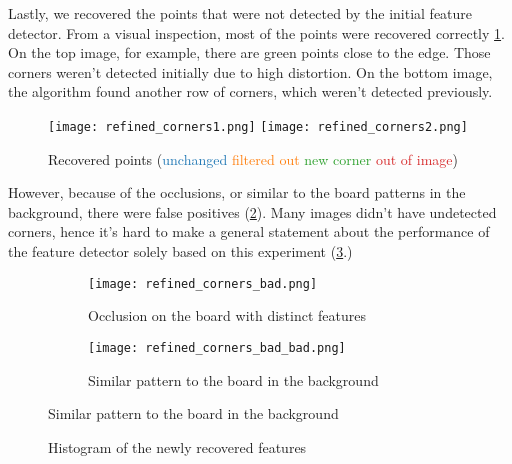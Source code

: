 Lastly, we recovered the points that were not detected by the initial feature
detector.
From a visual inspection, most of the points were recovered correctly
\cref{fig:recovered_good_points}.
On the top image, for example, there are green points close to the edge.
Those corners weren't detected initially due to high distortion. On the bottom
image, the algorithm found another row of corners, which weren't detected previously.

\begin{figure}[h]
	\centering
	\texttt{[image: refined\_corners1.png]}
	\texttt{[image: refined\_corners2.png]}

	\caption{Recovered points
		(\textcolor[HTML]{1f77b4}{unchanged}
		\textcolor[HTML]{ff7f0e}{filtered out}
		\textcolor[HTML]{2ca02c}{new corner}
		\textcolor[HTML]{d62728}{out of image})}
	\label{fig:recovered_good_points}
\end{figure}

\newpage
However,
because of the occlusions, or similar to the board patterns in the background,
there were false positives (\cref{fig:recovered_bad_points}). Many images didn't
have undetected corners, hence it's hard to make a general statement about the
performance of the feature detector solely based on this experiment
(\cref{fig:recovered_points_histogram}.)

\begin{figure}[h]
	\centering
	\begin{subfigure}[h]{0.6\linewidth}
		\texttt{[image: refined\_corners\_bad.png]}
		\caption{Occlusion on the board with distinct features}
	\end{subfigure}
	\begin{subfigure}[h]{0.6\linewidth}
		\texttt{[image: refined\_corners\_bad\_bad.png]}
		\caption{Similar pattern to the board in the background}
	\end{subfigure}
	\label{fig:recovered_bad_points}
\end{figure}

\begin{figure}[h!]
	\caption{Histogram of the newly recovered features}
	\label{fig:recovered_points_histogram}
\end{figure}



